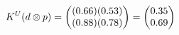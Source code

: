\documentclass[preview]{standalone}
\begin{document}
\begin{align*}
\special{dvisvgm:raw <g id='unique000'>}K^U(d \otimes p) = \begin{pmatrix} (0.66)(0.53) \\ (0.88)(0.78) \end{pmatrix} = \begin{pmatrix} 0.35 \\ 0.69 \end{pmatrix}\special{dvisvgm:raw </g>}
\end{align*}
\end{document}
